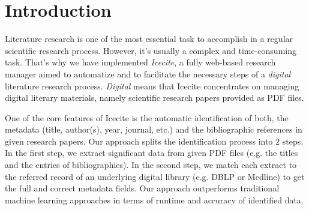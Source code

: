 \section{Introduction}
Literature research is one of the most essential task to accomplish in a regular scientific research process. However, it's usually a complex and time-consuming task. That's why we have implemented \textit{Icecite}, a fully web-based research manager aimed to automatize and to facilitate the necessary steps of a \textit{digital} literature research process. \textit{Digital} means that Icecite concentrates on managing digital literary materials, namely scientific research papers provided as PDF files.

One of the core features of Icecite is the automatic identification of both, the metadata (title, author(s), year, journal, etc.) and the bibliographic references in given research papers. Our approach splits the identification process into 2 steps. In the first step, we extract significant data from given PDF files (e.g. the titles and the entries of bibliographies). In the second step, we match each extract to the referred record of an underlying digital library (e.g. DBLP or Medline) to get the full and correct metadata fields. Our approach outperforms traditional machine learning approaches in terms of runtime and accuracy of identified data.

